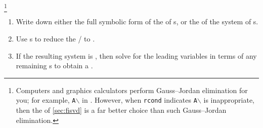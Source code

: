 \begin{procedure} \label{pro:gje}
\footnote{Computers and graphics calculators perform Gauss--Jordan elimination for you; for example, \texttt{A$\backslash$} in \script. 
However, when \texttt{rcond} indicates \texttt{A$\backslash$} is inappropriate, then the  of \cref{sec:fisvd} is a far better choice than such Gauss--Jordan elimination.}
\begin{enumerate}
\item Write down either the full symbolic form of the  of s, or the  of the system of s.
\item Use s to reduce the \slash{} to .
\item If the resulting system is , then solve for the leading variables in terms of any remaining s to obtain a .
\end{enumerate}
\end{procedure}



